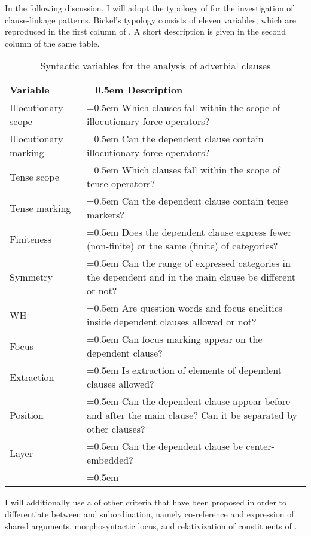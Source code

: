 In the following discussion, I will adopt the typology of \citet{Bickel2010} for the investigation of clause-linkage patterns. Bickel's typology consists of eleven variables, which are reproduced in the first column of . A short description is given in the second column of the same table. 
%
\begin{table}
	\caption{Syntactic variables for the analysis of adverbial clauses}
	\label{tab:Syntactic variables for the analysis of adverbial clauses}
	\small
	\begin{tabularx}{0.98\textwidth}[]{%
		>{\raggedright\arraybackslash}p{90pt}
		>{\raggedright\arraybackslash\hangindent=0.5em}X}
		
		\lsptoprule
			Variable			&	Description\\
		\midrule
			Illocutionary scope		&	Which clauses fall within the scope of illocutionary force operators?\\
			Illocutionary marking	&	Can the dependent clause contain illocutionary force operators?\\
			Tense scope			&	Which clauses fall within the scope of tense operators?\\
			Tense marking		&	Can the dependent clause contain tense markers?\\
			Finiteness			&	Does the dependent clause express fewer (non-finite) or the same \isi{number} (finite) of categories?\\
			Symmetry			&	Can the range of expressed categories in the dependent and in the main clause be different or not?\\
			WH				&	Are question words and focus enclitics inside dependent clauses allowed or not?\\
			Focus				&	Can focus marking appear on the dependent clause?\\
			Extraction			&	Is extraction of elements of dependent clauses allowed?\\
			Position			&	Can the dependent clause appear before and after the main clause? Can it be separated by other clauses?\\
			Layer				&	Can the dependent clause be center-embedded?\\
		\lspbottomrule
	\end{tabularx}
\end{table}

I will additionally use a  of other criteria that have been proposed in order to differentiate between  and subordination, namely co-reference and expression of shared arguments, morphosyntactic locus, and relativization of constituents of .

